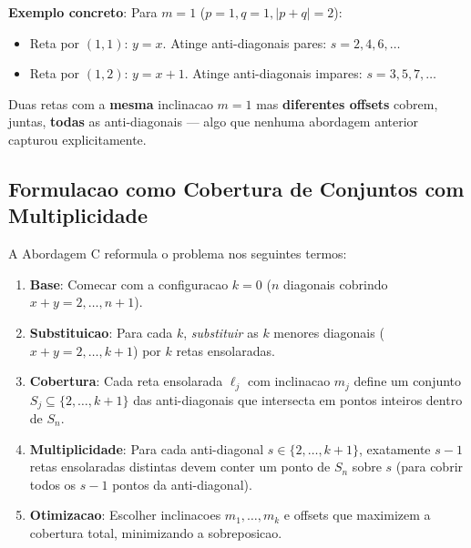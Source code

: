 \documentclass[5p]{elsarticle}
\theoremstyle{definition}
\begin{document}
\begin{center}
\end{center}

\textbf{Exemplo concreto}: Para $m = 1$ ($p=1, q=1, |p+q|=2$):
\begin{itemize}
  \item Reta por $(1,1)$: $y = x$. Atinge anti-diagonais pares: $s = 2, 4, 6, \dots$
  \item Reta por $(1,2)$: $y = x+1$. Atinge anti-diagonais impares: $s = 3, 5, 7, \dots$
\end{itemize}

Duas retas com a \textbf{mesma} inclinacao $m=1$ mas \textbf{diferentes offsets}
cobrem, juntas, \textbf{todas} as anti-diagonais — algo que nenhuma abordagem
anterior capturou explicitamente.

\subsection{Formulacao como Cobertura de Conjuntos com Multiplicidade}

A Abordagem C reformula o problema nos seguintes termos:

\begin{enumerate}[label=\textbf{C\arabic*}.]
  \item \textbf{Base}: Comecar com a configuracao $k=0$ ($n$ diagonais cobrindo
    $x+y = 2, \dots, n+1$).
  \item \textbf{Substituicao}: Para cada $k$, \textit{substituir} as $k$ menores
    diagonais ($x+y = 2, \dots, k+1$) por $k$ retas ensolaradas.
  \item \textbf{Cobertura}: Cada reta ensolarada $\ell_j$ com inclinacao $m_j$
    define um conjunto $S_j \subseteq \{2, \dots, k+1\}$ das anti-diagonais que
    intersecta em pontos inteiros dentro de $S_n$.
  \item \textbf{Multiplicidade}: Para cada anti-diagonal $s \in \{2, \dots, k+1\}$,
    exatamente $s-1$ retas ensolaradas distintas devem conter um ponto de $S_n$
    sobre $s$ (para cobrir todos os $s-1$ pontos da anti-diagonal).
  \item \textbf{Otimizacao}: Escolher inclinacoes $m_1, \dots, m_k$ e offsets que
    maximizem a cobertura total, minimizando a sobreposicao.
\end{enumerate}
\end{document}
